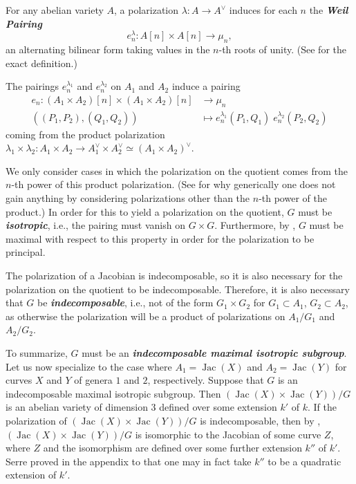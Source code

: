 \documentclass{amsproc}
\numberwithin{equation}{section}
\theoremstyle{definition}
\theoremstyle{remark}
\newcommand{\vocab}[1]{\textbf{\textit{\boldmath #1}}}
\DeclareMathOperator{\Jac}{Jac}
\begin{document}
For any abelian variety $A$, a polarization $\lambda: A \to A^\vee$  induces for each $n$ the \vocab{Weil Pairing}
\begin{equation}
e_n^{\lambda} \colon A[n] \times A[n] \to \mu_n,
\end{equation}
an alternating bilinear form taking values in the $n$-th roots of unity. (See \cite[\S 1.13]{milne_av} for the exact definition.)

The pairings $e_n^{\lambda_1}$ and $e_n^{\lambda_2}$ on $A_1$ and $A_2$ induce a pairing
\begin{equation}
\begin{aligned}
    e_n \colon (A_1 \times A_2)[n] \times (A_1 \times A_2)[n] &\to \mu_n\\
    ((P_1, P_2), (Q_1, Q_2)) &\mapsto e_n^{\lambda_1}(P_1, Q_1)\; e_n^{\lambda_2}(P_2, Q_2)
\end{aligned}
\end{equation}
coming from the product polarization 
$
    \lambda_1 \times \lambda_2 : A_1 \times A_2 \to A_1^\vee \times A_2^\vee \simeq (A_1 \times A_2)^\vee.
    $

We only consider cases in which the polarization on the quotient comes from the $n$-th power of this product polarization. (See \cite[Rmk. 1.1.4, Thm.~1.1.10]{HanselmanThesis} for why generically one does not gain anything by considering polarizations other than the $n$-th power of the product.) In order for this to yield a polarization on the quotient, $G$ must be \vocab{isotropic}, i.e., the pairing must vanish on $G\times G$. Furthermore, by \cite[Lem.~2.1]{computing_isogeny}, $G$ must be maximal with respect to this property in order for the polarization to be principal.

The polarization of a Jacobian is indecomposable, so it is also necessary for the polarization on the quotient to be indecomposable.
Therefore, it is also necessary that $G$ be \vocab{indecomposable}, i.e., not of the form $G_1 \times G_2$ for $G_1 \subset A_1$, $G_2 \subset A_2$, as otherwise the polarization will be a product of polarizations on $A_1/G_1$ and $A_2/G_2$.

To summarize, $G$ must be an \vocab{indecomposable maximal isotropic subgroup}. Let us now specialize to the case where $A_1 = \Jac(X)$ and $A_2 = \Jac(Y)$ for curves $X$ and $Y$ of genera $1$ and $2$, respectively. Suppose that $G$ is an indecomposable maximal isotropic subgroup. Then $(\Jac(X) \times \Jac(Y))/G$ is an abelian variety of dimension $3$ defined over some extension $k'$ of $k$. If the polarization of $(\Jac(X) \times \Jac(Y))/G$ is indecomposable, then by \cite{threefolds_are_jacobians}, $(\Jac(X) \times \Jac(Y))/G$ is isomorphic to the Jacobian of some curve $Z$, where $Z$ and the isomorphism are defined over some further extension $k''$ of $k'$. Serre proved in the appendix to \cite{lauter} that one may in fact take $k''$ to be a quadratic extension of $k'$.
\end{document}
